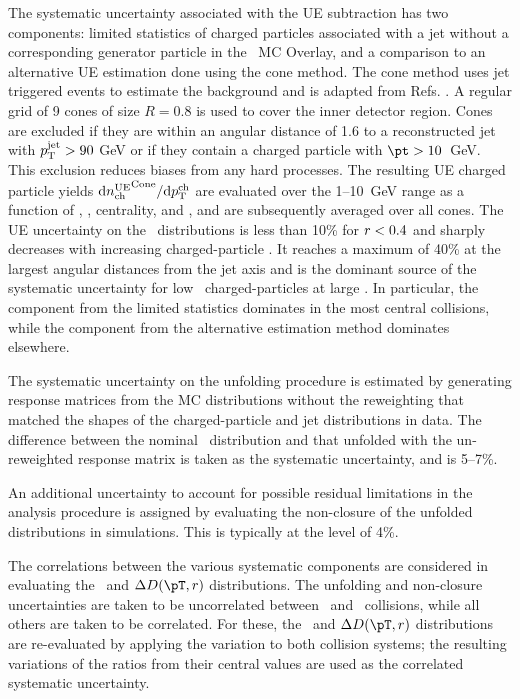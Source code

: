 The systematic uncertainty associated with the UE subtraction has two components: limited statistics
of charged particles associated with a jet without a corresponding generator particle in the \pbpb\ MC Overlay,
and a comparison to an alternative UE estimation done using the cone method. The cone method
uses jet triggered events to estimate the background and is adapted from Refs. \cite{Aaboud:2018hpb, Aaboud:2017bzv}. A 
regular grid of 9 cones of size $R = 0.8$ is used to cover the inner detector region. Cones are excluded
if they are within an angular distance of 1.6 to a reconstructed jet with $\mbox{$p_{\mathrm{T}}^{\mathrm{jet}}$} > 90$ GeV or if they
contain a charged particle with \mbox{$\pt > 10$ GeV}. This exclusion reduces biases from any
hard processes. The resulting UE charged particle yields $\mathrm{d} \mbox{$n_{\mathrm{ch}}^{\mathrm{UE}}$}^{\mathrm{Cone}}/ \mathrm{d} \mbox{$p_{{\mathrm{T}}}^{\mathrm{ch}}$}$ are 
evaluated over the \mbox{1--10 GeV} range as a function of \pttrk, \ptjet, centrality, and \rvar, and are
subsequently averaged over all cones. The UE uncertainty on the \Dptr\ distributions is less 
than 10\% for $\mbox{$r$} < 0.4$ and sharply decreases with increasing charged-particle \pT. It  reaches
a maximum of 40\% at the largest angular distances from the jet axis and is the dominant 
source of the systematic uncertainty for low \pt\ charged-particles at large \rvar. In 
particular, the component from the limited statistics dominates in the most central collisions, while the component from the alternative estimation method dominates elsewhere.


The systematic uncertainty on the unfolding procedure is estimated by generating response matrices from the MC distributions without the reweighting that matched the shapes of
the charged-particle and jet distributions in data. The difference between the nominal \Dptr\ distribution and that unfolded with the un-reweighted response matrix is taken as the systematic uncertainty, and is 5--7\%.

An additional uncertainty to account for possible residual limitations in the analysis procedure is assigned by evaluating the non-closure of the unfolded distributions in simulations. This is typically at the level of 4\%.

The correlations between the various systematic components are considered in evaluating the \RDptr\ and $\Delta\Dptr$ distributions. The unfolding and non-closure uncertainties are taken to be uncorrelated between \pp\ and \pbpb\ collisions, while all others are taken to be correlated. For these, the \RDptr\ and $\Delta\Dptr$ distributions are re-evaluated by applying the variation to both collision systems; the resulting variations of the ratios from their central values are used as the correlated systematic uncertainty. 

